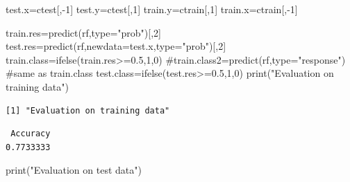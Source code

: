 \documentclass[
  letterpaper,
  DIV=11,
  numbers=noendperiod]{scrartcl}
\newenvironment{Shaded}{\begin{snugshade}}{\end{snugshade}}
\newcommand{\AttributeTok}[1]{\textcolor[rgb]{0.40,0.45,0.13}{#1}}
\newcommand{\CommentTok}[1]{\textcolor[rgb]{0.37,0.37,0.37}{#1}}
\newcommand{\DecValTok}[1]{\textcolor[rgb]{0.68,0.00,0.00}{#1}}
\newcommand{\FloatTok}[1]{\textcolor[rgb]{0.68,0.00,0.00}{#1}}
\newcommand{\FunctionTok}[1]{\textcolor[rgb]{0.28,0.35,0.67}{#1}}
\newcommand{\NormalTok}[1]{\textcolor[rgb]{0.00,0.23,0.31}{#1}}
\newcommand{\OtherTok}[1]{\textcolor[rgb]{0.00,0.23,0.31}{#1}}
\newcommand{\SpecialCharTok}[1]{\textcolor[rgb]{0.37,0.37,0.37}{#1}}
\newcommand{\StringTok}[1]{\textcolor[rgb]{0.13,0.47,0.30}{#1}}
\begin{document}
\begin{Shaded}
\begin{Highlighting}[]
\NormalTok{test.x}\OtherTok{=}\NormalTok{ctest[,}\SpecialCharTok{{-}}\DecValTok{1}\NormalTok{]}
\NormalTok{test.y}\OtherTok{=}\NormalTok{ctest[,}\DecValTok{1}\NormalTok{]}
\NormalTok{train.y}\OtherTok{=}\NormalTok{ctrain[,}\DecValTok{1}\NormalTok{]}
\NormalTok{train.x}\OtherTok{=}\NormalTok{ctrain[,}\SpecialCharTok{{-}}\DecValTok{1}\NormalTok{]}

\NormalTok{train.res}\OtherTok{=}\FunctionTok{predict}\NormalTok{(rf,}\AttributeTok{type=}\StringTok{"prob"}\NormalTok{)[,}\DecValTok{2}\NormalTok{]}
\NormalTok{test.res}\OtherTok{=}\FunctionTok{predict}\NormalTok{(rf,}\AttributeTok{newdata=}\NormalTok{test.x,}\AttributeTok{type=}\StringTok{"prob"}\NormalTok{)[,}\DecValTok{2}\NormalTok{]}
\NormalTok{train.class}\OtherTok{=}\FunctionTok{ifelse}\NormalTok{(train.res}\SpecialCharTok{\textgreater{}=}\FloatTok{0.5}\NormalTok{,}\DecValTok{1}\NormalTok{,}\DecValTok{0}\NormalTok{)}
\CommentTok{\#train.class2=predict(rf,type="response") \#same as train.class}
\NormalTok{test.class}\OtherTok{=}\FunctionTok{ifelse}\NormalTok{(test.res}\SpecialCharTok{\textgreater{}=}\FloatTok{0.5}\NormalTok{,}\DecValTok{1}\NormalTok{,}\DecValTok{0}\NormalTok{)}
\FunctionTok{print}\NormalTok{(}\StringTok{"Evaluation on training data"}\NormalTok{)}
\end{Highlighting}
\end{Shaded}

\begin{verbatim}
[1] "Evaluation on training data"
\end{verbatim}

\begin{Shaded}
\end{Shaded}

\begin{verbatim}
 Accuracy 
0.7733333 
\end{verbatim}

\begin{Shaded}
\begin{Highlighting}[]
\FunctionTok{print}\NormalTok{(}\StringTok{"Evaluation on test data"}\NormalTok{)}
\end{Highlighting}
\end{Shaded}
\end{document}
